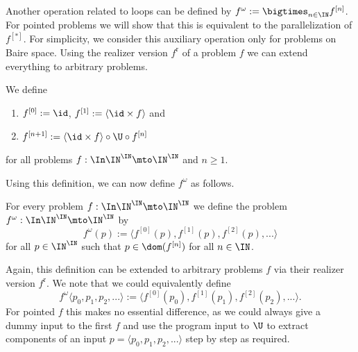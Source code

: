 \documentclass{lmcs}
\def\r{\mathrm{r}}
\begin{document}
\noindent
Another operation related to loops can be defined by $f^\omega:=\bigtimes_{n\in\IN}f^{[n]}$.
For pointed problems we will show that this is equivalent to the
parallelization of $f^{[*]}$. 
For simplicity, we 
consider this auxiliary operation only for problems on Baire space.
Using the realizer version $f^\r$ of a problem $f$ we can extend everything to arbitrary problems.

\begin{defi}
We define
\begin{enumerate}
\item $f^{[0]}:=\id$, $f^{[1]}:=\langle\id\times f\rangle$ and 
\item $f^{[n+1]}:=\langle\id\times f\rangle\circ\U\circ f^{[n]}$ 
\end{enumerate}
for all problems $f:\In\IN^\IN\mto\IN^\IN$ and $n\geq1$.
\end{defi}

\noindent
Using this definition, we can now define $f^\omega$ as follows.

\begin{defi}
For every problem $f:\In\IN^\IN\mto\IN^\IN$ we define the problem ${f^\omega:\In\IN^\IN\mto\IN^\IN}$ by
\[f^\omega(p):=\langle f^{[0]}(p),f^{[1]}(p),f^{[2]}(p),...\rangle\]
for all $p\in\IN^\IN$ such that $p\in\dom(f^{[n]})$ for all $n\in\IN$.
\end{defi}

\noindent
Again, this definition can be extended to arbitrary problems $f$ via their realizer version $f^\r$.
We note that we could equivalently define 
\[f^\omega\langle p_0,p_1,p_2,...\rangle:=\langle f^{[0]}(p_0),f^{[1]}(p_1),f^{[2]}(p_2),...\rangle.\]
For pointed $f$ this makes no essential difference, as we could always give a dummy input to the first $f$
and use the program input to $\U$ to extract components of an input $p=\langle p_0,p_1,p_2,...\rangle$ step by step as required.
\end{document}
